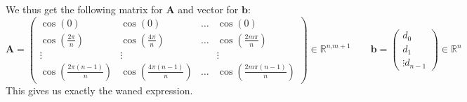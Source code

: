 \documentclass{article}
\begin{document}
We thus get the following matrix for $\mathbf{A}$ and vector for $\mathbf{b}$:
\begin{equation*}
    \mathbf{A} = 
    \begin{pmatrix}
    \cos\left(0\right) & \cos\left(0\right) & \dots &  \cos\left(0\right) \\[1mm]
    \cos\left(\frac{2\pi}{n}\right) &\cos\left(\frac{4\pi}{n}\right) & \dots & \cos\left(\frac{2m\pi}{n}\right) \\
    \vdots & \vdots & & \vdots \\
    \cos\left(\frac{2\pi\left(n-1\right)}{n}\right) &\cos\left(\frac{4\pi\left(n-1\right)}{n}\right) & \dots & \cos\left(\frac{2m\pi\left(n-1\right)}{n}\right)
    \end{pmatrix} \in \mathbb{R}^{n\text{,}m+1} \qquad 
    \mathbf{b} = \begin{pmatrix}
    d_{0} \\
    d_{1} \\
    \vdots
    d_{n-1}
    \end{pmatrix} \in \mathbb{R}^{n}
\end{equation*}
This gives us exactly the waned expression. 
\end{document}
